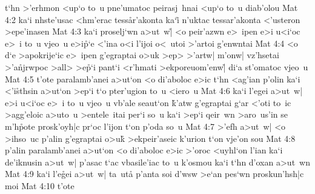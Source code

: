 t`hn
>'erhmon
<up`o
to~u
pne'umatoc
peirasj~hnai
<up`o
to~u
diab'olou\bibvsend
\vs Mat 4:2
ka`i
nhste'usac
<hm'erac
tes\-s\r{a}\-r'a\-kon\-ta
ka`i\r{}
n'uktac
tessar'akonta
<'usteron
>epe'inasen\bibvsend
\vs Mat 4:3
ka`i
proselj`wn
a>ut~w|\r{}
<o
peir'azwn
e>~ipen
e>i
u<i`oc
e>~i
to~u
vjeo~u
e>i\r{p}`e
<'ina
o<i
l'ijoi
o<~utoi
>'artoi
g'enwntai\bibvsend
\vs Mat 4:4
<o
d`e
>apokrije`ic
e>~ipen
g'egraptai
o>uk
>ep>
>'artw|
m'onw|
vz'hsetai
>'a\r{n}jrwpoc
>all>
>e\r{p}`i
pant`i
<r'hmati
>ekporeuom'enw|\r{}
di`a
st'omatoc
vjeo~u\bibvsend
\vs Mat 4:5
t'ote
paralamb'anei
a>ut`on
<o
di'aboloc
e>ic
t`hn
<ag'ian
p'olin
ka`i
<'i\r{s}thsin
a>ut`on
>ep`i
t`o
pter'ugion
to~u
<iero~u\bibvsend
\vs Mat 4:6
ka`i
l'egei
a>ut~w|
e>i
u<i`oc
e>~i
to~u
vjeo~u
vb'ale
seaut`on
\r{k}'atw
g'egraptai
g`ar
<'oti
to~ic
>agg'eloic
a>uto~u
>entele~itai
per`i
so~u
ka`i
>ep`i
qeir~wn
>aro~us'in
se
m'h\r{p}ote
prosk'oyh|c
pr`oc
l'ijon
t`on
p'oda
so~u\bibvsend
\vs Mat 4:7
>'efh
a>ut~w|
<o
>ihso~uc
p'alin
g'egraptai
o>uk\r{}
>ekpeir'aseic
k'urion
t`on
vje'on
sou\bibvsend
\vs Mat 4:8
p'alin
paralamb'anei
a>ut`on
<o
di'aboloc
e>ic
>'oroc
<uyhl`on
l'ian
ka`i
de'iknusin
a>ut~w|
p'asac
t`ac
vbasile'iac
to~u
k'osmou
ka`i
t`hn
d'oxan
a>ut~wn\bibvsend
\vs Mat 4:9
ka`i
l'e\r{g}ei
a>ut~w|
ta~uta\r{}
p'anta
soi
d'wsw
>e`an
pes`wn
proskun'hsh|c
moi\bibvsend
\vs Mat 4:10
t'ote

